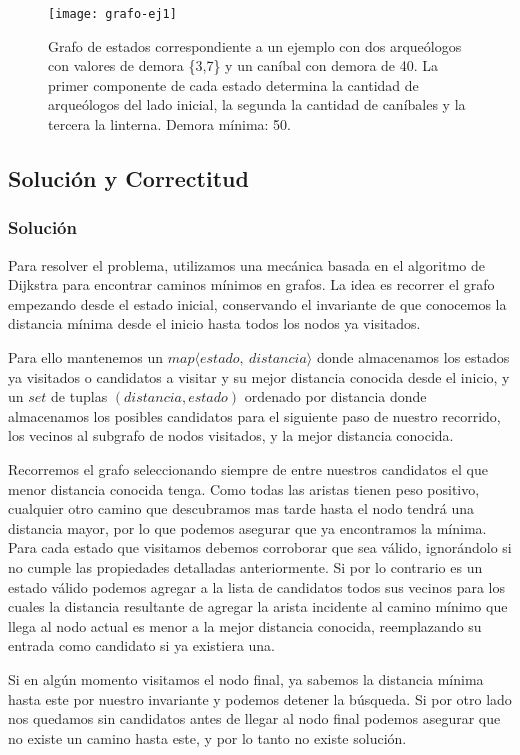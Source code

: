 \begin{figure}[H]
    \centering
    \texttt{[image: grafo-ej1]}
    \caption{Grafo de estados correspondiente a un ejemplo con dos arqueólogos con valores de demora \{3,7\} y un caníbal con demora de 40. La primer componente de cada estado determina la cantidad de arqueólogos del lado inicial, la segunda la cantidad de caníbales y la tercera la linterna. Demora mínima: 50.}
    \label{fig:ej1-graph}
\end{figure}


\subsection{Solución y Correctitud}
    \subsubsection{Solución}

    Para resolver el problema, utilizamos una mecánica basada en el algoritmo de Dijkstra para encontrar caminos mínimos en grafos. La idea es recorrer el grafo empezando desde el estado inicial, conservando el invariante de que conocemos la distancia mínima desde el inicio hasta todos los nodos ya visitados.

    Para ello mantenemos un $map\langle {estado,\ distancia} \rangle$ donde almacenamos los estados ya visitados o candidatos a visitar y su mejor distancia conocida desde el inicio, y un $set$ de tuplas $(distancia, estado)$ ordenado por distancia donde almacenamos los posibles candidatos para el siguiente paso de nuestro recorrido, los vecinos al subgrafo de nodos visitados, y la mejor distancia conocida.

    Recorremos el grafo seleccionando siempre de entre nuestros candidatos el que menor distancia conocida tenga. Como todas las aristas tienen peso positivo, cualquier otro camino que descubramos mas tarde hasta el nodo tendrá una distancia mayor, por lo que podemos asegurar que ya encontramos la mínima. Para cada estado que visitamos debemos corroborar que sea válido, ignorándolo si no cumple las propiedades detalladas anteriormente. Si por lo contrario es un estado válido podemos agregar a la lista de candidatos todos sus vecinos para los cuales la distancia resultante de agregar la arista incidente al camino mínimo que llega al nodo actual es menor a la mejor distancia conocida, reemplazando su entrada como candidato si ya existiera una.

    Si en algún momento visitamos el nodo final, ya sabemos la distancia mínima hasta este por nuestro invariante y podemos detener la búsqueda. Si por otro lado nos quedamos sin candidatos antes de llegar al nodo final podemos asegurar que no existe un camino hasta este, y por lo tanto no existe solución.
\\

